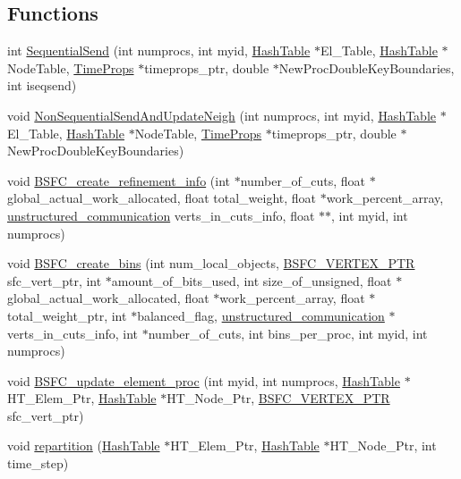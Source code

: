 \subsection*{Functions}
\begin{CompactItemize}
\item 
int \hyperlink{repartition__BSFC_8C_a10}{Sequential\-Send} (int numprocs, int myid, \hyperlink{classHashTable}{Hash\-Table} $\ast$El\_\-Table, \hyperlink{classHashTable}{Hash\-Table} $\ast$Node\-Table, \hyperlink{structTimeProps}{Time\-Props} $\ast$timeprops\_\-ptr, double $\ast$New\-Proc\-Double\-Key\-Boundaries, int iseqsend)
\item 
void \hyperlink{repartition__BSFC_8C_a11}{Non\-Sequential\-Send\-And\-Update\-Neigh} (int numprocs, int myid, \hyperlink{classHashTable}{Hash\-Table} $\ast$El\_\-Table, \hyperlink{classHashTable}{Hash\-Table} $\ast$Node\-Table, \hyperlink{structTimeProps}{Time\-Props} $\ast$timeprops\_\-ptr, double $\ast$New\-Proc\-Double\-Key\-Boundaries)
\item 
void \hyperlink{repartition__BSFC_8C_a12}{BSFC\_\-create\_\-refinement\_\-info} (int $\ast$number\_\-of\_\-cuts, float $\ast$global\_\-actual\_\-work\_\-allocated, float total\_\-weight, float $\ast$work\_\-percent\_\-array, \hyperlink{structunstructured__communication}{unstructured\_\-communication} verts\_\-in\_\-cuts\_\-info, float $\ast$$\ast$, int myid, int numprocs)
\item 
void \hyperlink{repartition__BSFC_8C_a13}{BSFC\_\-create\_\-bins} (int num\_\-local\_\-objects, \hyperlink{structsfc__vertex}{BSFC\_\-VERTEX\_\-PTR} sfc\_\-vert\_\-ptr, int $\ast$amount\_\-of\_\-bits\_\-used, int size\_\-of\_\-unsigned, float $\ast$global\_\-actual\_\-work\_\-allocated, float $\ast$work\_\-percent\_\-array, float $\ast$total\_\-weight\_\-ptr, int $\ast$balanced\_\-flag, \hyperlink{structunstructured__communication}{unstructured\_\-communication} $\ast$verts\_\-in\_\-cuts\_\-info, int $\ast$number\_\-of\_\-cuts, int bins\_\-per\_\-proc, int myid, int numprocs)
\item 
void \hyperlink{repartition__BSFC_8C_a14}{BSFC\_\-update\_\-element\_\-proc} (int myid, int numprocs, \hyperlink{classHashTable}{Hash\-Table} $\ast$HT\_\-Elem\_\-Ptr, \hyperlink{classHashTable}{Hash\-Table} $\ast$HT\_\-Node\_\-Ptr, \hyperlink{structsfc__vertex}{BSFC\_\-VERTEX\_\-PTR} sfc\_\-vert\_\-ptr)
\item 
void \hyperlink{repartition__BSFC_8C_a15}{repartition} (\hyperlink{classHashTable}{Hash\-Table} $\ast$HT\_\-Elem\_\-Ptr, \hyperlink{classHashTable}{Hash\-Table} $\ast$HT\_\-Node\_\-Ptr, int time\_\-step)
$$
\end{CompactItemize}
